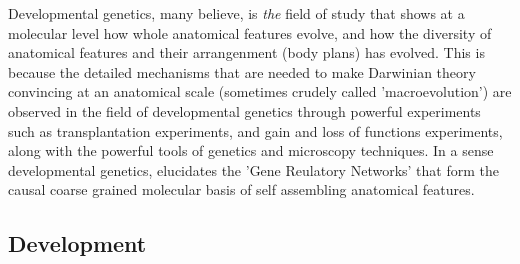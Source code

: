 Developmental genetics, many believe, is \textit{the} field of study that shows at a molecular level how whole anatomical features evolve, and how the diversity of anatomical features and their arrangenment (body plans) has evolved.  This is because the detailed mechanisms that are needed to make Darwinian theory convincing at an anatomical scale (sometimes crudely called 'macroevolution') are observed in the field of developmental genetics through powerful experiments such as transplantation experiments, and gain and loss of functions experiments, along with the powerful tools of genetics and microscopy techniques.  In a sense developmental genetics, elucidates the 'Gene Reulatory Networks' that form the causal coarse grained molecular basis of self assembling anatomical features. 
\subsection{Development}

